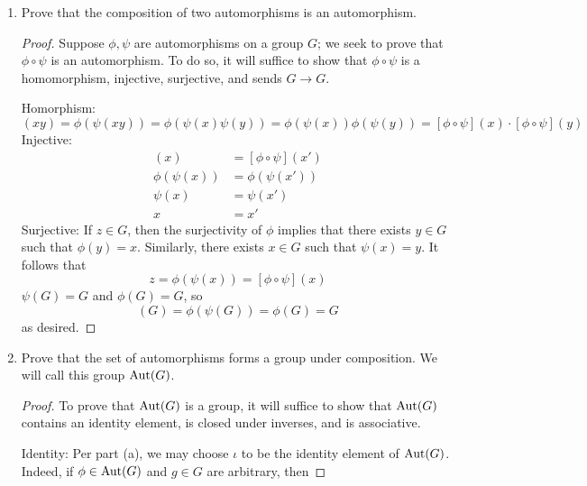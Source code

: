 \documentclass[../psets.tex]{subfiles}
\begin{document}
\begin{enumerate}
\begin{enumerate}
\begin{proof}
            Naturally, $\iota:G\to G$.
        \end{proof}
        \item Prove that the composition of two automorphisms is an automorphism.
        \begin{proof}
            Suppose $\phi,\psi$ are automorphisms on a group $G$; we seek to prove that $\phi\circ\psi$ is an automorphism. To do so, it will suffice to show that $\phi\circ\psi$ is a homomorphism, injective, surjective, and sends $G\to G$.\par
            Homorphism:
            \begin{equation*}
                [\phi\circ\psi](xy) = \phi(\psi(xy))
                = \phi(\psi(x)\psi(y))
                = \phi(\psi(x))\phi(\psi(y))
                = [\phi\circ\psi](x)\cdot[\phi\circ\psi](y)
            \end{equation*}
            Injective:
            \begin{align*}
                [\phi\circ\psi](x) &= [\phi\circ\psi](x')\\
                \phi(\psi(x)) &= \phi(\psi(x'))\\
                \psi(x) &= \psi(x')\\
                x &= x'
            \end{align*}
            Surjective: If $z\in G$, then the surjectivity of $\phi$ implies that there exists $y\in G$ such that $\phi(y)=x$. Similarly, there exists $x\in G$ such that $\psi(x)=y$. It follows that
            \begin{equation*}
                z = \phi(\psi(x))
                = [\phi\circ\psi](x)
            \end{equation*}
            $\psi(G)=G$ and $\phi(G)=G$, so
            \begin{equation*}
                [\phi\circ\psi](G) = \phi(\psi(G))
                = \phi(G)
                = G
            \end{equation*}
            as desired.
        \end{proof}
        \item Prove that the set of automorphisms forms a group under composition. We will call this group $\operatorname{Aut}(G)$.
        \begin{proof}
            To prove that $\operatorname{Aut}(G)$ is a group, it will suffice to show that $\operatorname{Aut}(G)$ contains an identity element, is closed under inverses, and is associative.\par
            Identity: Per part (a), we may choose $\iota$ to be the identity element of $\operatorname{Aut}(G)$. Indeed, if $\phi\in\operatorname{Aut}(G)$ and $g\in G$ are arbitrary, then

\end{proof}
\end{enumerate}
\end{enumerate}
\end{document}
